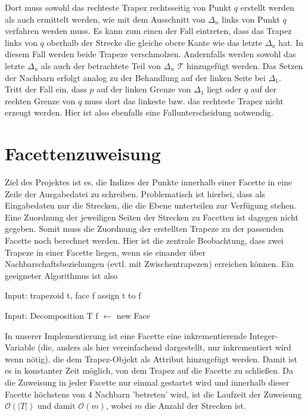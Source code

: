 \documentclass[11pt, a4paper]{article}
\newcommand{\abs}[1]{\left\lvert#1\right\rvert}
\newcommand{\T}{\ensuremath{\mathcal{T}} }
\begin{document}
Dort muss sowohl das rechteste Trapez rechtsseitig von Punkt $q$ erstellt werden als auch ermittelt werden, wie mit dem Ausschnitt von $\Delta_n$ links von Punkt $q$ verfahren werden muss. Es kann zum einen der Fall eintreten, dass das Trapez links von $q$ oberhalb der Strecke die gleiche obere Kante wie das letzte $\Delta_u$ hat. In diesem Fall werden beide Trapeze verschmolzen. Andernfalls werden sowohl das letzte $\Delta_u$ als auch der betrachtete Teil von $\Delta_n$ \T hinzugefügt werden. Das Setzen der Nachbarn erfolgt analog zu der Behandlung auf der linken Seite bei $\Delta_1$.\\
Tritt der Fall ein, dass $p$ auf der linken Grenze von $\Delta_1$ liegt oder $q$ auf der rechten Grenze von $q$ muss dort das linkeste bzw. das rechteste Trapez nicht erzeugt werden. Hier ist also ebenfalls eine Fallunterscheidung notwendig.

\section{Facettenzuweisung}
Ziel des Projektes ist es, die Indizes der Punkte innerhalb einer Facette in eine Zeile der Ausgabedatei zu schreiben. Problematisch ist hierbei, dass als Eingabedaten nur die Strecken, die die Ebene unterteilen zur Verfügung stehen. Eine Zuordnung der jeweiligen Seiten der Strecken zu Facetten ist dagegen nicht gegeben. Somit muss die Zuordnung der erstellten Trapeze zu der passenden Facette noch berechnet werden. Hier ist die zentrale Beobachtung, dass zwei Trapeze in einer Facette liegen, wenn sie einander über Nachbarschaftsbeziehungen (evtl. mit Zwischentrapezen) erreichen können. Ein geeigneter Algorithmus ist also

\begin{algorithmic}[1]
\State Input: trapezoid t, face f
		\State assign t to f
			\State {}
		\EndFor
	\EndIf
\EndFunction

\State Input: Decomposition T
		\State f $\gets$ new Face
		\State {}
	\EndFor
\EndFunction
\end{algorithmic}

In unserer Implementierung ist eine Facette eine inkrementierende Integer-Variable (die, anders als hier vereinfachend dargestellt, nur inkrementiert wird wenn nötig), die dem Trapez-Objekt als Attribut hinzugefügt werden. Damit ist es in konstanter Zeit möglich, von dem Trapez auf die Facette zu schließen. Da die Zuweisung in jeder Facette nur einmal gestartet wird und innerhalb dieser Facette höchstens von $4$ Nachbarn 'betreten' wird, ist die Laufzeit der Zuweisung $\mathcal{O}(\abs{T})$ und damit $\mathcal{O}(m)$, wobei $m$ die Anzahl der Strecken ist.
\end{document}
